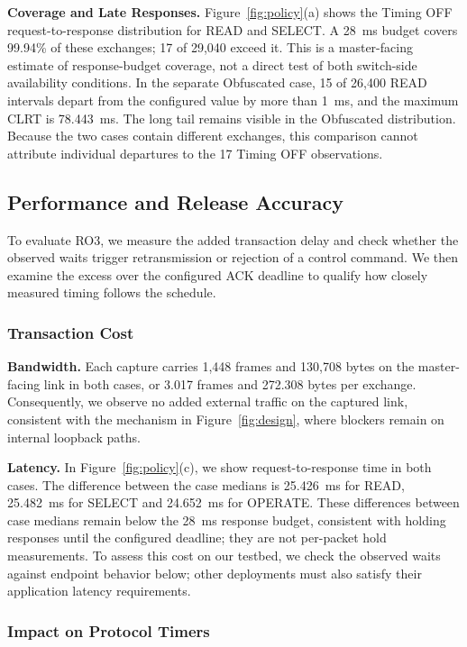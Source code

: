 \textbf{Coverage and Late Responses.} Figure~\ref{fig:policy}(a) shows the Timing OFF
request-to-response distribution for READ and SELECT. A 28~ms budget covers 99.94\% of these
exchanges; 17 of 29{,}040 exceed it. This is a master-facing estimate of response-budget coverage,
not a direct test of both switch-side availability conditions. In the separate Obfuscated case,
15 of 26{,}400 READ intervals depart from the configured value by more than 1~ms, and the maximum
CLRT is 78.443~ms. The long tail remains visible in the Obfuscated distribution. Because the two cases contain
different exchanges, this comparison cannot attribute individual departures to the 17 Timing OFF
observations.

\subsection{Performance and Release Accuracy}
\label{sec:eval:perf}

To evaluate RO3, we measure the added transaction delay and check whether the observed waits
trigger retransmission or rejection of a control command. We then examine the excess over the
configured ACK deadline to qualify how closely measured timing follows the schedule.

\subsubsection{Transaction Cost}
\label{sec:eval:cost}

\textbf{Bandwidth.} Each capture carries 1{,}448 frames and 130{,}708 bytes on the master-facing
link in both cases, or 3.017 frames and 272.308 bytes per exchange. Consequently, we observe no added external traffic on the captured link, consistent with the
mechanism in Figure~\ref{fig:design}, where blockers remain on internal loopback paths.

\textbf{Latency.} In Figure~\ref{fig:policy}(c), we show request-to-response time in both cases.
The difference between the case medians is 25.426~ms for READ, 25.482~ms for SELECT and 24.652~ms
for OPERATE. These differences between case medians remain below the 28~ms response budget, consistent with
holding responses until the configured deadline; they are not per-packet hold measurements. To assess this cost on our testbed, we check the observed waits against endpoint behavior below;
other deployments must also satisfy their application latency requirements.

\subsubsection{Impact on Protocol Timers}
\label{sec:eval:timers}

